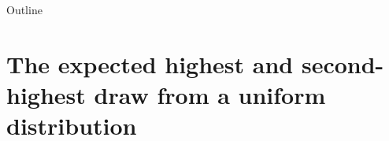

\maketitle

  \newcommand{\intuition}[1]{#1} %


\begin{frame}{Outline}
    \tableofcontents
\end{frame}





\section{The expected highest and second-highest draw from a uniform distribution}















